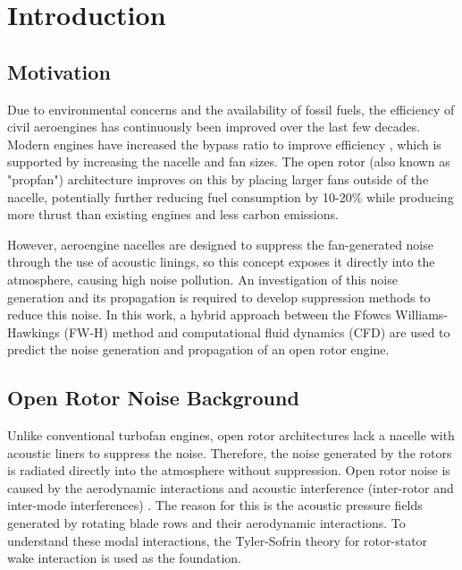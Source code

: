 
\chapter{Introduction} \label{ch:intro}

\section{Motivation} \label{sec:motivation}
Due to environmental concerns and the availability of fossil fuels, the efficiency of civil aeroengines has continuously been improved over the last few decades. Modern engines have increased the bypass ratio to improve efficiency \cite{Cumpsty2015}, which is supported by increasing the nacelle and fan sizes. The open rotor (also known as "propfan") architecture improves on this by placing larger fans outside of the nacelle, potentially further reducing fuel consumption by 10-20\% \cite{Farokhi2020} while producing more thrust than existing engines and less carbon emissions.

However, aeroengine nacelles are designed to suppress the fan-generated noise through the use of acoustic linings, so this concept exposes it directly into the atmosphere, causing high noise pollution. An investigation of this noise generation and its propagation is required to develop suppression methods to reduce this noise. In this work, a hybrid approach between the Ffowcs Williams-Hawkings (FW-H) method and computational fluid dynamics (CFD) are used to predict the noise generation and propagation of an open rotor engine.

\section{Open Rotor Noise Background} \label{sec:open_rotor_noise_background}
Unlike conventional turbofan engines, open rotor architectures lack a nacelle with acoustic liners to suppress the noise. Therefore, the noise generated by the rotors is radiated directly into the atmosphere without suppression. Open rotor noise is caused by the aerodynamic interactions and acoustic interference (inter-rotor and inter-mode interferences) \cite{Hanson1985}. The reason for this is the acoustic pressure fields generated by rotating blade rows and their aerodynamic interactions. To understand these modal interactions, the Tyler-Sofrin theory for rotor-stator wake interaction is used as the foundation. 

